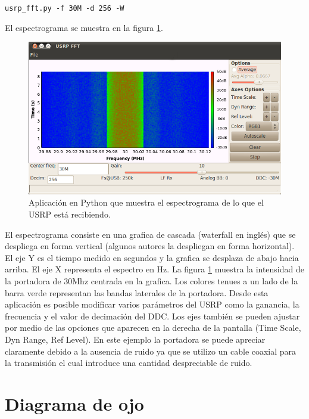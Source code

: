 \begin{center}
\verb|usrp_fft.py -f 30M -d 256 -W|
\end{center}

El espectrograma se muestra en la figura \ref{fig:spectrogramgui}.

\begin{figure}[htp]
  \centering
  \includegraphics[scale=0.7]{figs/spectrogramgui}
  \vspace{0.3in}
  \caption{Aplicaci\'on en Python que muestra el espectrograma de lo que el USRP est\'a recibiendo.}
  \label{fig:spectrogramgui}
\end{figure}

El espectrograma consiste en una grafica de cascada (waterfall en ingl\'es) que se despliega en
forma vertical (algunos autores la despliegan en forma horizontal). El eje Y es el tiempo medido en
segundos y la grafica se desplaza de abajo hacia arriba. El eje X representa el espectro en Hz. La
figura \ref{fig:spectrogramgui} muestra la intensidad de la portadora de 30Mhz centrada en la
grafica. Los colores tenues a un lado de la barra verde representan las bandas laterales de la
portadora. Desde esta aplicaci\'on es posible modificar varios par\'ametros del USRP como la
ganancia, la frecuencia y el valor de decimaci\'on del DDC. Los ejes tambi\'en se pueden ajustar por
medio de las opciones que aparecen en la derecha de la pantalla (Time Scale, Dyn Range, Ref Level).
En este ejemplo la portadora se puede apreciar claramente debido a la ausencia de ruido ya que se
utilizo un cable coaxial para la transmisi\'on el cual introduce una cantidad despreciable de ruido.
\section{Diagrama de ojo}

